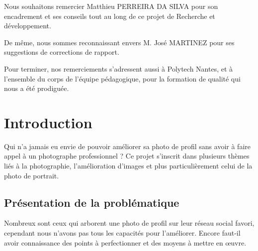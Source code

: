 \documentclass[11pt, french]{report-rd-info}
\begin{document}
\begin{classification}
\end{classification}
\maketitle
\begin{acknowledgements}
Nous souhaitons remercier Matthieu PERREIRA DA SILVA pour son encadrement et ses conseils tout au long de ce projet de Recherche et développement.

De même, nous sommes reconnaissant envers M. José MARTINEZ pour ses suggestions de corrections de rapport.

Pour terminer, nos remerciements s'adressent aussi à Polytech Nantes, et à l'ensemble du corps de l'équipe pédagogique, pour la formation de qualité qui nous a été prodiguée.
\end{acknowledgements}
\newpage
\tableofcontents
\chapter{Introduction}
Qui n'a jamais eu envie de pouvoir améliorer sa photo de profil sans avoir à faire appel à un photographe professionnel ? Ce projet s'inscrit dans plusieurs thèmes liés à la photographie, l'amélioration d'images et plus particulièrement celui de la photo de portrait.
\section{Présentation de la problématique}
Nombreux sont ceux qui arborent une photo de profil sur leur réseau social favori, cependant nous n'avons pas tous les capacités pour l'améliorer. Encore faut-il avoir connaissance des points à perfectionner et des moyens à mettre en œuvre.
\end{document}
